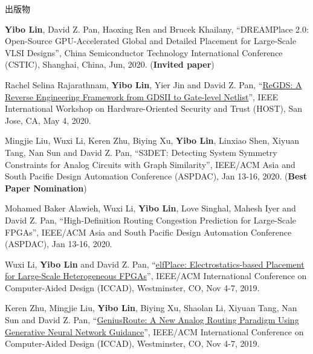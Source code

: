 \begin{rSection}{出版物}
\begin{description}[font=\normalfont]
\item[{[C37]}]{
        \textbf{Yibo Lin}, David Z. Pan, Haoxing Ren and Brucek Khailany, 
    ``DREAMPlace 2.0: Open-Source GPU-Accelerated Global and Detailed Placement for Large-Scale VLSI Designs'', 
    China Semiconductor Technology International Conference (CSTIC), Shanghai, China, Jun, 2020.
    (\textbf{Invited paper})
}
            

\item[{[C36]}]{
        Rachel Selina Rajarathnam, \textbf{Yibo Lin}, Yier Jin and David Z. Pan, 
    ``\href{https://doi.org/10.1109/HOST45689.2020.9300272}{ReGDS: A Reverse Engineering Framework from GDSII to Gate-level Netlist}'', 
    IEEE International Workshop on Hardware-Oriented Security and Trust (HOST), San Jose, CA, May 4, 2020.
    
}
            

\item[{[C35]}]{
        Mingjie Liu, Wuxi Li, Keren Zhu, Biying Xu, \textbf{Yibo Lin}, Linxiao Shen, Xiyuan Tang, Nan Sun and David Z. Pan, 
    ``S3DET: Detecting System Symmetry Constraints for Analog Circuits with Graph Similarity'', 
    IEEE/ACM Asia and South Pacific Design Automation Conference (ASPDAC), Jan 13-16, 2020.
    (\textbf{Best Paper Nomination})
}
            

\item[{[C34]}]{
        Mohamed Baker Alawieh, Wuxi Li, \textbf{Yibo Lin}, Love Singhal, Mahesh Iyer and David Z. Pan, 
    ``High-Definition Routing Congestion Prediction for Large-Scale FPGAs'', 
    IEEE/ACM Asia and South Pacific Design Automation Conference (ASPDAC), Jan 13-16, 2020.
    
}
            

\item[{[C33]}]{
        Wuxi Li, \textbf{Yibo Lin} and David Z. Pan, 
    ``\href{https://doi.org/10.1109/ICCAD45719.2019.8942075}{elfPlace: Electrostatics-based Placement for Large-Scale Heterogeneous FPGAs}'', 
    IEEE/ACM International Conference on Computer-Aided Design (ICCAD), Westminster, CO, Nov 4-7, 2019.
    
}
            

\item[{[C32]}]{
        Keren Zhu, Mingjie Liu, \textbf{Yibo Lin}, Biying Xu, Shaolan Li, Xiyuan Tang, Nan Sun and David Z. Pan, 
    ``\href{https://doi.org/10.1109/ICCAD45719.2019.8942164}{GeniusRoute: A New Analog Routing Paradigm Using Generative Neural Network Guidance}'', 
    IEEE/ACM International Conference on Computer-Aided Design (ICCAD), Westminster, CO, Nov 4-7, 2019.
    
}
\end{description}
\end{rSection}

